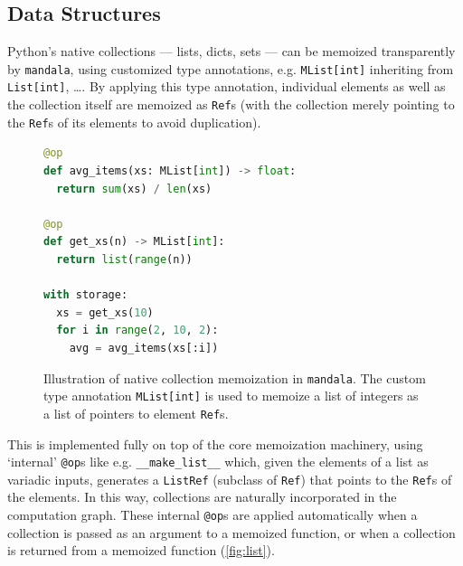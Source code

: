 \subsection{Data Structures}
\label{subsection:data-structures}

Python's native collections --- lists, dicts, sets --- can be memoized
transparently by \texttt{mandala}, using customized type annotations, e.g.
\texttt{MList[int]} inheriting from \texttt{List[int]}, \ldots. By applying this
type annotation, individual elements as well as the collection itself are
memoized as \texttt{Ref}s (with the collection merely pointing to the
\texttt{Ref}s of its elements to avoid duplication).

\begin{figure}
    \centering
    \begin{lstlisting}[language=python]
@op
def avg_items(xs: MList[int]) -> float:
  return sum(xs) / len(xs)

@op
def get_xs(n) -> MList[int]:
  return list(range(n))

with storage:
  xs = get_xs(10)
  for i in range(2, 10, 2):
    avg = avg_items(xs[:i])
    \end{lstlisting}
    \caption{Illustration of native collection memoization in \texttt{mandala}.
    The custom type annotation \texttt{MList[int]} is used to memoize a list of
    integers as a list of pointers to element \texttt{Ref}s.}
    \label{fig:list}
\end{figure}

This is implemented fully on top of the core memoization machinery, using
`internal' \texttt{@op}s like e.g. \verb|__make_list__| which, given the
elements of a list as variadic inputs, generates a \texttt{ListRef} (subclass of
\texttt{Ref}) that points to the \texttt{Ref}s of the elements. In this way,
collections are naturally incorporated in the computation graph. These internal
\texttt{@op}s are applied automatically when a collection is passed as an
argument to a memoized function, or when a collection is returned from a
memoized function (\autoref{fig:list}).


